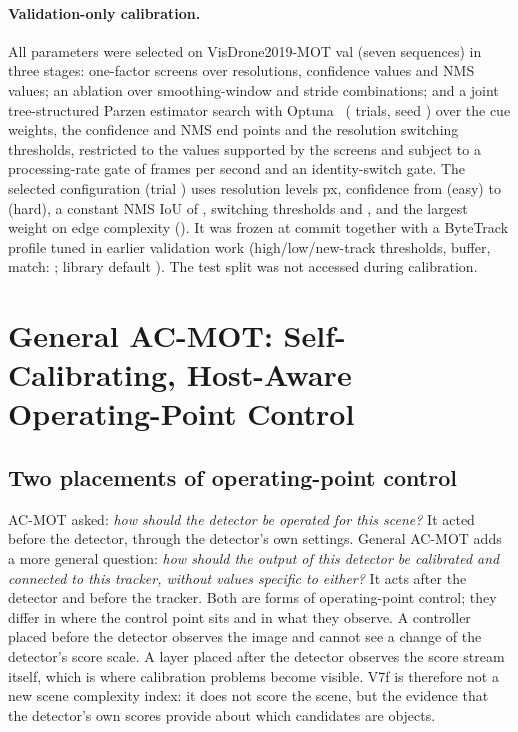 \documentclass[pdflatex,sn-mathphys-num]{sn-jnl}
\begin{document}
\paragraph{Validation-only calibration.} All parameters were selected on VisDrone2019-MOT val (seven sequences) in three stages: one-factor screens over  resolutions,  confidence values and  NMS values; an ablation over  smoothing-window and stride combinations; and a joint tree-structured Parzen estimator search with Optuna~\cite{akiba2019optuna} ( trials, seed ) over the cue weights, the confidence and NMS end points and the resolution switching thresholds, restricted to the values supported by the screens and subject to a processing-rate gate of  frames per second and an identity-switch gate. The selected configuration (trial ) uses resolution levels  px, confidence from  (easy) to  (hard), a constant NMS IoU of , switching thresholds  and , and the largest weight on edge complexity (). It was frozen at commit \texttt{} together with a ByteTrack profile tuned in earlier validation work (high/low/new-track thresholds, buffer, match: ; library default ). The test split was not accessed during calibration.

\section{General AC-MOT: Self-Calibrating, Host-Aware Operating-Point Control}\label{sec:method}
\subsection{Two placements of operating-point control}\label{sec:placements}
AC-MOT asked: \emph{how should the detector be operated for this scene?} It acted before the detector, through the detector's own settings. General AC-MOT adds a more general question: \emph{how should the output of this detector be calibrated and connected to this tracker, without values specific to either?} It acts after the detector and before the tracker. Both are forms of operating-point control; they differ in where the control point sits and in what they observe. A controller placed before the detector observes the image and cannot see a change of the detector's score scale. A layer placed after the detector observes the score stream itself, which is where calibration problems become visible. V7f is therefore not a new scene complexity index: it does not score the scene, but the evidence that the detector's own scores provide about which candidates are objects.
\end{document}
